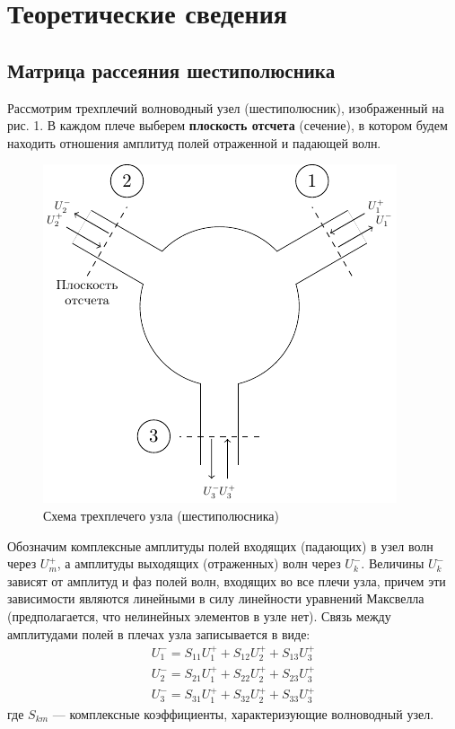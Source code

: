 \documentclass[a4paper,12pt]{article}
\begin{document}
\section{Теоретические сведения}
\subsection{Матрица рассеяния шестиполюсника}

Рассмотрим трехплечий волноводный узел (шестиполюсник), изображенный на рис. 1. В каждом плече выберем \textbf{плоскость отсчета} (сечение), в котором будем находить отношения амплитуд полей отраженной и падающей волн.

\begin{figure}[h!]
	\centering
	\includegraphics[scale=1.5]{ris/ris1}
	\caption{Схема трехплечего узла (шестиполюсника)}
	\label{fig:figure1}
\end{figure}

Обозначим комплексные амплитуды полей входящих (падающих) в узел волн через $U_m^+$, а амплитуды выходящих (отраженных) волн через $U_k^-$. 
Величины $U_k^-$ зависят от амплитуд и фаз полей волн, входящих во все плечи узла, причем эти зависимости являются линейными в силу линейности уравнений Максвелла (предполагается, что нелинейных элементов в узле нет). 
Связь между амплитудами полей в плечах узла записывается в виде:
\begin{gather}
	\label{eq:usu}
	{ U _ { 1 } ^ { - } = S _ { 11 } U _ { 1 } ^ { + } + S _ { 12 } U _ { 2 } ^ { + } + S _ { 13 } U _ { 3 } ^ { + } } \\ 
	{ U _ { 2 } ^ { - } = S _ { 21 } U _ { 1 } ^ { + } + S _ { 22 } U _ { 2 } ^ { + } + S _ { 23 } U _ { 3 } ^ { + } } \\
	{ U _ { 3 } ^ { - } = S _ { 31 } U _ { 1 } ^ { + } + S _ { 32 } U _ { 2 } ^ { + } + S _ { 33 } U _ { 3 } ^ { + } } 
\end{gather}
где $S_{km}$ ---  комплексные коэффициенты, характеризующие волноводный узел. 
\end{document}
